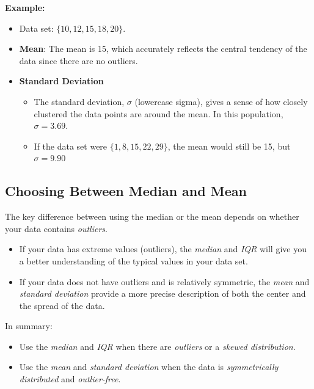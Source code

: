 \documentclass[12pt]{article}
\begin{document}
\textbf{Example:}

\begin{itemize}
  \item Data set: $\{10, 12, 15, 18, 20\}$.
  \item \textbf{Mean}: The mean is 15, which accurately reflects the central
        tendency of the data since there are no outliers.
  \item \textbf{Standard Deviation}
        \begin{itemize}
          \item The standard deviation, $\sigma$ (lowercase sigma), gives a
                sense of how closely clustered the data points are around the
                mean. In this population, $\sigma = 3.69$.
          \item If the data set were $\{1, 8, 15, 22, 29\}$, the mean would still
                be 15, but $\sigma = 9.90$
        \end{itemize}


\end{itemize}

\subsection{Choosing Between Median and Mean}

The key difference between using the median or the mean depends on whether your
data contains \emph{outliers}.

\begin{itemize}
  \item If your data has extreme values (outliers), the \emph{median} and
        \emph{IQR} will give you a better understanding of the typical values in
        your data set.
  \item If your data does not have outliers and is relatively symmetric, the
        \emph{mean} and \emph{standard deviation} provide a more precise
        description of both the center and the spread of the data.
\end{itemize}

In summary:
\begin{itemize}
  \item Use the \emph{median} and \emph{IQR} when there are \emph{outliers} or
        a \emph{skewed distribution}.
  \item Use the \emph{mean} and \emph{standard deviation} when the data is
        \emph{symmetrically distributed} and \emph{outlier-free}.
\end{itemize}
\end{document}
